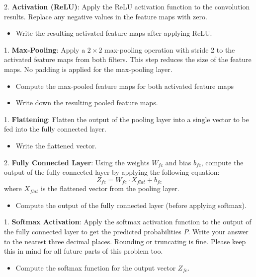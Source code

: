 \documentclass[a4 paper]{article}
\begin{document}
2. \textbf{Activation (ReLU)}: Apply the ReLU activation function to the convolution results. Replace any negative values in the feature maps with zero.
    \begin{itemize}
        \item Write the resulting activated feature maps after applying ReLU.
    \end{itemize}

\solution{}


1. \textbf{Max-Pooling}: Apply a $2 \times 2$ max-pooling operation with stride 2 to the activated feature maps from both filters. This step reduces the size of the feature maps. No padding is applied for the max-pooling layer.
    \begin{itemize}
        \item Compute the max-pooled feature maps for both activated feature maps
        \item Write down the resulting pooled feature maps.
    \end{itemize}

\solution{}



1. \textbf{Flattening}: Flatten the output of the pooling layer into a single vector to be fed into the fully connected layer.
    \begin{itemize}
        \item Write the flattened vector.
    \end{itemize}

2. \textbf{Fully Connected Layer}: Using the weights $W_{fc}$ and bias $b_{fc}$, compute the output of the fully connected layer by applying the following equation:
    \[
    Z_{fc} = W_{fc} \cdot X_{flat} + b_{fc}
    \]
    where $X_{flat}$ is the flattened vector from the pooling layer.
    \begin{itemize}
        \item Compute the output of the fully connected layer (before applying softmax).
    \end{itemize}

\solution{}



1. \textbf{Softmax Activation}: Apply the softmax activation function to the output of the fully connected layer to get the predicted probabilities $P$. Write your answer to the nearest three decimal places. Rounding or truncating is fine. Please keep this in mind for all future parts of this problem too.
    \begin{itemize}
        \item Compute the softmax function for the output vector $Z_{fc}$.
    \end{itemize}
\end{document}
